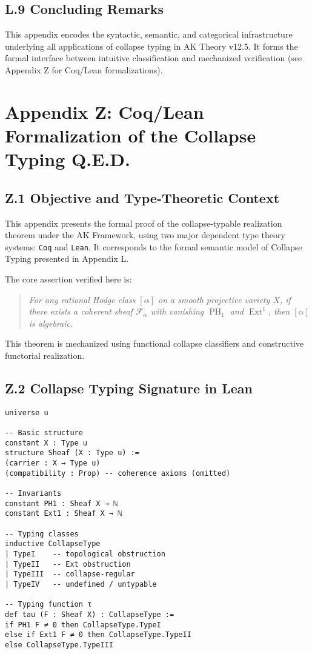 \documentclass[11pt]{article}
\DeclareMathOperator{\Ext}{Ext}
\DeclareMathOperator{\PH}{PH}
\begin{document}
\subsection*{L.9 Concluding Remarks}

This appendix encodes the syntactic, semantic, and categorical infrastructure underlying all applications of collapse typing in AK Theory v12.5.  
It forms the formal interface between intuitive classification and mechanized verification (see Appendix Z for Coq/Lean formalizations).



\section*{Appendix Z: Coq/Lean Formalization of the Collapse Typing Q.E.D.}

\subsection*{Z.1 Objective and Type-Theoretic Context}

This appendix presents the formal proof of the collapse-typable realization theorem under the AK Framework, using two major dependent type theory systems: \texttt{Coq} and \texttt{Lean}.  
It corresponds to the formal semantic model of Collapse Typing presented in Appendix L.

The core assertion verified here is:

\begin{quote}
\emph{For any rational Hodge class $[\alpha]$ on a smooth projective variety $X$, if there exists a coherent sheaf $\mathcal{F}_\alpha$ with vanishing $\PH_1$ and $\Ext^1$, then $[\alpha]$ is algebraic.}
\end{quote}

This theorem is mechanized using functional collapse classifiers and constructive functorial realization.

\subsection*{Z.2 Collapse Typing Signature in Lean}

\begin{lstlisting}[language=Lean, caption={Collapse Typing Function $\tau$ in Lean}]
universe u

-- Basic structure
constant X : Type u
structure Sheaf (X : Type u) :=
(carrier : X → Type u)
(compatibility : Prop) -- coherence axioms (omitted)

-- Invariants
constant PH1 : Sheaf X → ℕ
constant Ext1 : Sheaf X → ℕ

-- Typing classes
inductive CollapseType
| TypeI    -- topological obstruction
| TypeII   -- Ext obstruction
| TypeIII  -- collapse-regular
| TypeIV   -- undefined / untypable

-- Typing function τ
def tau (F : Sheaf X) : CollapseType :=
if PH1 F ≠ 0 then CollapseType.TypeI
else if Ext1 F ≠ 0 then CollapseType.TypeII
else CollapseType.TypeIII
\end{lstlisting}
\end{document}
